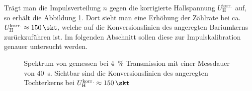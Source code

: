 \documentclass[11pt, a4paper]{article}
\numberwithin{equation}{section}
\begin{document}
Trägt man die Impulsverteilung $n$ gegen die korrigierte Hallspannung $U_\mathrm{H}^\mathrm{korr.}$ auf, so erhält die Abbildung \ref{fig:ba_t4_grob}.
Dort sieht man eine Erhöhung der Zählrate bei ca. $U_\mathrm{H}^\mathrm{korr.} \approx \SI{150}{\skt}$, welche auf die Konversionslinien des angeregten Bariumkerns zurückzuführen ist.
Im folgenden Abschnitt sollen diese zur Impulskalibration genauer untersucht werden.
\begin{figure}[h]
	\centering
	
	\caption{Spektrum von  gemessen bei \SI{4}{\percent} Transmission mit einer Messdauer von \SI{40}{\second}. Sichtbar sind die Konversionslinien des angeregten  Tochterkerns bei $U_\mathrm{H}^\mathrm{korr.} \approx \SI{150}{\skt}$}
	\label{fig:ba_t4_grob}
\end{figure}
\end{document}
